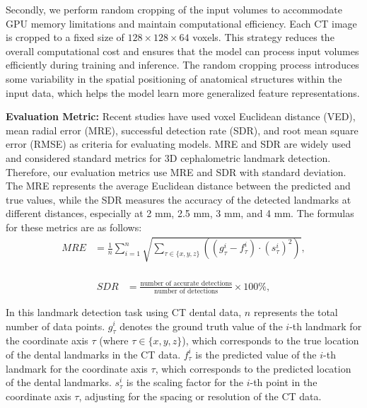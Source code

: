 Secondly, we perform random cropping of the input volumes to accommodate GPU memory limitations and maintain computational efficiency. Each CT image is cropped to a fixed size of $128 \times 128 \times 64$ voxels. This strategy reduces the overall computational cost and ensures that the model can process input volumes efficiently during training and inference. The random cropping process introduces some variability in the spatial positioning of anatomical structures within the input data, which helps the model learn more generalized feature representations.

\noindent \textbf{Evaluation Metric:} Recent studies have used voxel Euclidean distance (VED), mean radial error (MRE), successful
detection rate (SDR), and root mean square error (RMSE) as criteria for evaluating models. MRE and SDR are widely used and considered standard metrics for 3D cephalometric landmark detection. Therefore, our evaluation metrics use MRE and SDR with standard deviation. The MRE represents the average Euclidean distance between the predicted and true values, while the SDR measures the accuracy of the detected landmarks at different distances, especially at 2 mm, 2.5 mm, 3 mm, and 4 mm. The formulas for these metrics are as follows:
\vspace{2mm}
\begin{equation}
\begin{aligned}
MRE &= \frac{1}{n} \sum_{i=1}^{n} \sqrt{\sum_{\tau \in \{x, y, z\}} \left( (g_{\tau}^i - f_{\tau}^i) \cdot (s_{\tau}^i)^2 \right)}, \\
\end{aligned}
\end{equation}
\vspace{2mm}

\begin{equation}
\begin{aligned}
SDR &= \frac{\text{number of accurate detections}}{\text{number of detections}} \times 100\%,
\end{aligned}
\end{equation}
\vspace{2mm}

In this landmark detection task using CT dental data, \( n \) represents the total number of data points. \( g_{\tau}^i \) denotes the ground truth value of the \( i \)-th landmark for the coordinate axis \( \tau \) (where \( \tau \in \{x, y, z\} \)), which corresponds to the true location of the dental landmarks in the CT data. \( f_{\tau}^i \) is the predicted value of the \( i \)-th landmark for the coordinate axis \( \tau \), which corresponds to the predicted location of the dental landmarks. \( s_{\tau}^i \) is the scaling factor for the \( i \)-th point in the coordinate axis \( \tau \), adjusting for the spacing or resolution of the CT data.



